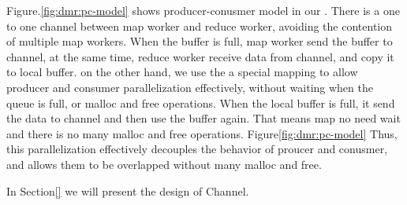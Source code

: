 Figure.\ref{fig:dmr:pc-model} shows producer-conusmer model in our \myds.  
There is a one to one channel between map worker and reduce worker, 
avoiding the contention of multiple map workers.
When the buffer is full, map worker send the buffer to channel, 
at the same time, 
reduce worker receive data from channel, and copy it to local buffer.
on the other hand,
we use the a special mapping to allow producer and consumer parallelization effectively, 
without waiting when the queue is full, or malloc and free operations.
When the local buffer is full,
it send the data to channel and then use the buffer again.
That means map no need wait and there is no many malloc and free operations.
Figure\ref{fig:dmr:pc-model}
Thus, this parallelization effectively decouples the behavior of proucer and conusmer, and allows them to be overlapped 
without many malloc and free.

In Section\ref{} we will present the design of Channel.




%






